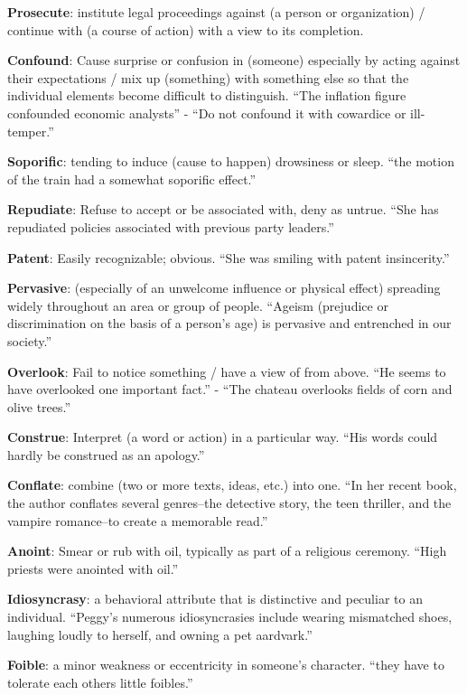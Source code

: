 \documentclass[12pt, a4paper]{ximera}
\begin{document}
\textbf{Prosecute}: institute legal proceedings against (a person or organization) / continue with (a course of action) with a view to its completion. 

\textbf{Confound}: Cause surprise or confusion in (someone) especially by acting against their expectations / mix up (something) with something else so that the individual elements become difficult to distinguish. ``The inflation figure confounded economic analysts'' - ``Do not confound it with cowardice or ill-temper.''

\textbf{Soporific}: tending to induce (cause to happen) drowsiness or sleep. ``the motion of the train had a somewhat soporific effect.''

\textbf{Repudiate}: Refuse to accept or be associated with, deny as untrue. ``She has repudiated policies associated with previous party leaders.''

\textbf{Patent}: Easily recognizable; obvious. ``She was smiling with patent insincerity.''

\textbf{Pervasive}: (especially of an unwelcome influence or physical effect) spreading widely throughout an area or group of people. ``Ageism (prejudice or discrimination on the basis of a person's age) is pervasive and entrenched in our society.''

\textbf{Overlook}: Fail to notice something / have a view of from above. ``He seems to have overlooked one important fact.'' - ``The chateau overlooks fields of corn and olive trees.''

\textbf{Construe}: Interpret (a word or action) in a particular way. ``His words could hardly be construed as an apology.''

\textbf{Conflate}: combine (two or more texts, ideas, etc.) into one. ``In her recent book, the author conflates several genres--the detective story, the teen thriller, and the vampire romance--to create a memorable read.''

\textbf{Anoint}: Smear or rub with oil, typically as part of a religious ceremony. ``High priests were anointed with oil.''

\textbf{Idiosyncrasy}: a behavioral attribute that is distinctive and peculiar to an individual. ``Peggy's numerous idiosyncrasies include wearing mismatched shoes, laughing loudly to herself, and owning a pet aardvark.''

\textbf{Foible}: a minor weakness or eccentricity in someone's character. ``they have to tolerate each others little foibles.''
\end{document}
